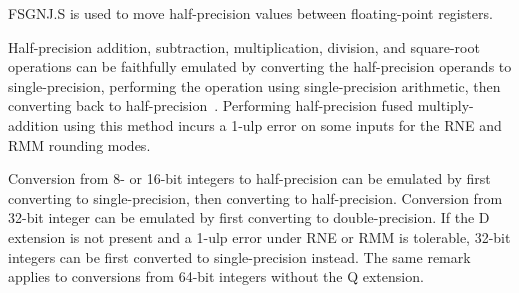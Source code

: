 \begin{commentary}
FSGNJ.S is used to move half-precision values between floating-point registers.
\end{commentary}

\begin{commentary}
Half-precision addition, subtraction, multiplication, division, and
square-root operations can be faithfully emulated by converting the
half-precision operands to single-precision, performing the operation
using single-precision arithmetic, then converting back to
half-precision~\cite{roux:hal-01091186}.
Performing half-precision fused multiply-addition using this method incurs
a 1-ulp error on some inputs for the RNE and RMM rounding modes.

Conversion from 8- or 16-bit integers to half-precision can be emulated by
first converting to single-precision, then converting to half-precision.
Conversion from 32-bit integer can be emulated by first converting to
double-precision.
If the D extension is not present and a 1-ulp error under RNE or RMM is
tolerable, 32-bit integers can be first converted to single-precision instead.
The same remark applies to conversions from 64-bit integers without the Q
extension.
\end{commentary}
